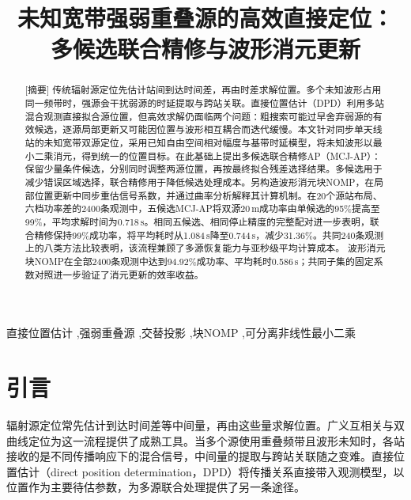 \documentclass[a4paper,fleqn]{cas-sc}
\numberwithin{equation}{section}
\numberwithin{figure}{section}
\numberwithin{table}{section}
\begin{document}
\let\WriteBookmarks\relax
{}
\shortauthors{}
\title[mode=title]{未知宽带强弱重叠源的高效直接定位：\\多候选联合精修与波形消元更新}

\begin{abstract}[摘要]
传统辐射源定位先估计站间到达时间差，再由时差求解位置。多个未知波形占用同一频带时，强源会干扰弱源的时延提取与跨站关联。直接位置估计（DPD）利用多站混合观测直接拟合源位置，但高效求解仍面临两个问题：粗搜索可能过早舍弃弱源的有效候选，逐源局部更新又可能因位置与波形相互耦合而迭代缓慢。本文针对同步单天线站的未知宽带双源定位，采用已知自由空间相对幅度与基带时延模型，将未知波形以最小二乘消元，得到统一的位置目标。在此基础上提出多候选联合精修AP（MCJ-AP）：保留少量条件候选，分别同时调整两源位置，再按最终拟合残差选择结果。多候选用于减少错误区域选择，联合精修用于降低候选处理成本。另构造波形消元块NOMP，在局部位置更新中同步重估信号系数，并通过曲率分析解释其计算机制。在20个源站布局、六档功率差的2400条观测中，五候选MCJ-AP将双源20\,m成功率由单候选的95\%提高至99\%，平均求解时间为0.718\,s。相同五候选、相同停止精度的完整配对进一步表明，联合精修保持99\%成功率，将平均耗时从1.084\,s降至0.744\,s，减少31.36\%。共同240条观测上的八类方法比较表明，该流程兼顾了多源恢复能力与亚秒级平均计算成本。
波形消元块NOMP在全部2400条观测中达到94.92\%成功率、平均耗时0.586\,s；共同子集的固定系数对照进一步验证了消元更新的效率收益。
\end{abstract}
\begin{keywords}[关键词]
直接位置估计 \sep 强弱重叠源 \sep 交替投影 \sep 块NOMP \sep 可分离非线性最小二乘
\end{keywords}


\maketitle

\section{引言}\label{sec:introduction}
辐射源定位常先估计到达时间差等中间量，再由这些量求解位置。广义互相关与双曲线定位为这一流程提供了成熟工具\cite{KnappCarter1976,ChanHo1994}。当多个源使用重叠频带且波形未知时，各站接收的是不同传播响应下的混合信号，中间量的提取与跨站关联随之变难。直接位置估计（direct position determination，DPD）将传播关系直接带入观测模型，以位置作为主要待估参数，为多源联合处理提供了另一条途径\cite{ChenHudsonYao2002,WeissAmar2005}。
\end{document}
